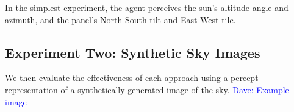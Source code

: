 \documentclass[11pt]{article}
\newcommand{\dnote}[1]{\textcolor{blue}{Dave: #1}}
\begin{document}
In the simplest experiment, the agent perceives the sun's altitude angle and azimuth, and the panel's North-South tilt and East-West tile.

\subsection{Experiment Two: Synthetic Sky Images}

We then evaluate the effectiveness of each approach using a percept representation of a synthetically generated image of the sky.
\dnote{Example image}

\begin{figure}
\begin{center}
 \hspace{10mm}

\end{center}
\end{figure}
\end{document}
